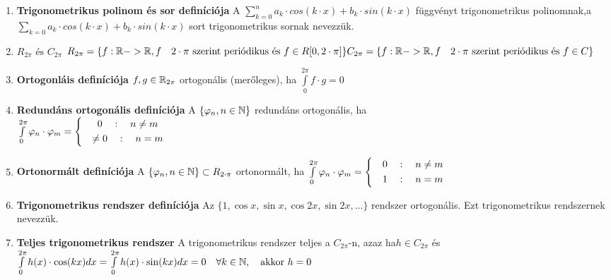 \documentclass{article}
\begin{document}
\begin{enumerate}
	\item\textbf{Trigonometrikus polinom és sor definíciója}\br
	A $\sum\limits_{k=0}^n a_k\cdot cos(k\cdot x)+b_k\cdot sin(k\cdot x)$
	függvényt trigonometrikus polinomnak,\br a $\sum\limits_{k=0} a_k\cdot
	cos(k\cdot x)+b_k\cdot sin(k\cdot x)$ sort trigonometrikus sornak nevezzük.
	
	\item\textbf{$R_{2\pi}\text{ és }C_{2\pi}$}\br
	$R_{2\pi}=\{f:\R->\R,f\quad 2\cdot\pi\text{ szerint periódikus és }f\in R[0,2\cdot\pi] \}\br
	C_{2\pi}=\{f:\R->\R,f\quad 2\cdot\pi\text{ szerint periódikus és }f\in C\}$
	
	\item\textbf{Ortogonláis definíciója}\br
	$f,g\in\mathbb{R}_{2\pi}$ ortogonális (merőleges), ha $\int\limits_0^{2\pi}f\cdot g=0$
	
	\item\textbf{Redundáns ortogonális definíciója}\br
	A $\{\varphi_n , n\in\mathbb{N} \}$ redundáns ortogonális, ha 
	$\int\limits_0^{2\pi}\varphi_n\cdot\varphi_m=
	\left\{
	\begin{gathered}
	\quad 0\quad:\quad n\neq m\hspace{5.7cm} \\
	\quad \neq0\quad:\quad n=m\hspace{5.7cm}
	\end{gathered}\right.$
	
	\item\textbf{Ortonormált definíciója}\br
	A $\{\varphi_n , n\in\mathbb{N}\}\subset R_{2\cdot\pi}$ ortonormált, ha 
	$\int\limits_0^{2\pi}\varphi_n\cdot\varphi_m=
	\left\{
	\begin{gathered}
	\quad 0\quad:\quad n\neq m\hspace{5.7cm} \\
	\quad 1\quad:\quad n=m\hspace{5.7cm}
	\end{gathered}\right.$
	
	\item\textbf{Trigonometrikus rendszer definíciója}\br
	Az $\{ 1, \cos x, \sin x, \cos 2x, \sin 2x, ... \}$ rendszer ortogonális.\br
	Ezt trigonometrikus rendszernek nevezzük.
	
	\item\textbf{Teljes trigonometrikus rendszer}\br
	A trigonometrikus rendszer teljes a $C_{2\pi}$-n, azaz ha\br$h\in
	C_{2\pi}$ és $\int\limits_0^{2\pi}h(x)\cdot\cos(kx)dx=
	\int\limits_0^{2\pi}h(x)\cdot\sin(kx)dx=0\quad\forall k\in\mathbb{N},\quad
	\text{akkor }h=0$
	

\end{enumerate}
\end{document}
